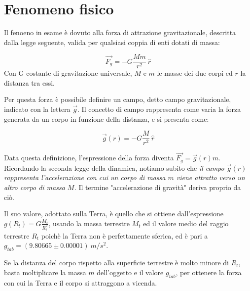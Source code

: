\documentclass[12pt, a4paper]{article}
\title{\textbf{\scalebox{1.3}{\text{Caduta libera}}}}
\date{}
\begin{document}
\maketitle
{}%

\section{Fenomeno fisico}
Il fenoeno in esame è dovuto alla forza di attrazione gravitazionale, descritta dalla legge seguente, valida per qualsiasi coppia di enti dotati di massa: 

\begin{equation*}
    \Vec{F_g} = -G\frac{M m}{r^2}\ \hat{r}
\end{equation*}
Con G costante di gravitazione universale, $M$ e $m$ le masse dei due corpi ed $r$ la distanza tra essi.

Per questa forza è possibile definire un campo, detto campo gravitazionale, indicato con la lettera $\Vec{g}$. 
Il concetto di campo rappresenta come varia la forza generata da un corpo in funzione della distanza, e si presenta come: 

\begin{equation*}
    \Vec{g}(r) = -G\frac{M}{r^2}\  \hat{r}
\end{equation*}

Data questa definizione, l'espressione della forza diventa $\Vec{F_g} = \Vec{g}(r)m$. 
Ricordando la seconda legge della dinamica, notiamo subito che \textit{il campo $\Vec{g}(r)$ rappresenta l'accelerazione con cui un corpo di massa $m$ viene attratto verso un altro corpo di massa $M$.} 
Il termine "accelerazione di gravità" deriva proprio da ciò.

Il suo valore, adottato sulla Terra, è quello che si ottiene dall'espressione $\displaystyle {g(R_t) = G\frac{M_t}{R_t^2}}$, usando la massa terrestre $M_t$ ed il valore medio del raggio terrestre $R_t$ poichè la Terra non è perfettamente sferica, ed è pari a $g_{tab}=(9.80665\pm 0.00001)\ m/s^2$.

Se la distanza del corpo rispetto alla superficie terrestre è molto minore di $R_t$, basta moltiplicare la massa $m$ dell'oggetto e il valore $g_{tab}$, per ottenere la forza con cui la Terra e il corpo si attraggono a vicenda.
\end{document}
